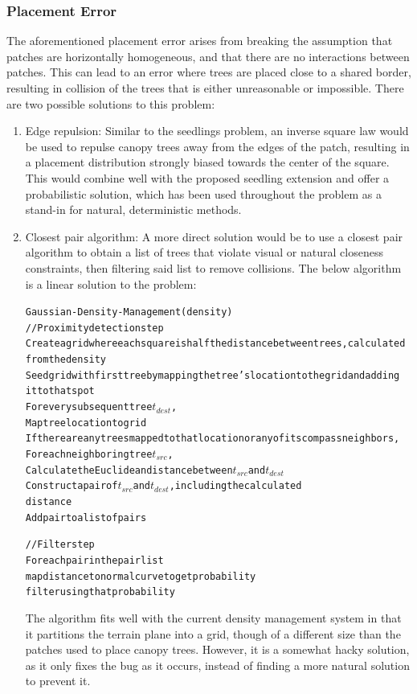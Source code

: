 \documentclass{article}
\newcommand{\tab}{\hspace*{2em}}
\begin{document}
            \subsubsection{Placement Error}
    \tab The aforementioned placement error arises from breaking the assumption that patches are
horizontally homogeneous, and that there are no interactions between patches. This can lead to an
error where trees are placed close to a shared border, resulting in collision of the trees that is
either unreasonable or impossible. There are two possible solutions to this problem:
\begin{enumerate}
    \item Edge repulsion: Similar to the seedlings problem, an inverse square law would be used to
repulse canopy trees away from the edges of the patch, resulting in a placement distribution
strongly biased towards the center of the square. This would combine well with the proposed
seedling extension and offer a probabilistic solution, which has been used throughout the problem
as a stand-in for natural, deterministic methods.

    \item Closest pair algorithm: A more direct solution would be to use a closest pair
algorithm\cite{kramii14} to obtain a list of trees that violate visual or natural closeness
constraints, then filtering said list to remove collisions. The below algorithm is a linear
solution to the problem:
\begin{alltt}
Gaussian-Density-Management(density)
    // Proximity detection step
    Create a grid where each square is half the distance between trees, calculated
        from the density
    Seed grid with first tree by mapping the tree's location to the grid and adding
        it to that spot
    For every subsequent tree \(t_{dest}\),
        Map tree location to grid
        If there are any trees mapped to that location or any of its compass neighbors,
            For each neighboring tree \(t_{src}\),
                Calculate the Euclidean distance between \(t_{src}\) and \(t_{dest}\)
                Construct a pair of \(t_{src}\) and \(t_{dest}\), including the calculated
                    distance
                Add pair to a list of pairs

    // Filter step
    For each pair in the pair list
        map distance to normal curve to get probability
        filter using that probability
    \end{alltt}
    \tab The algorithm fits well with the current density management system in that it partitions
the terrain plane into a grid, though of a different size than the patches used to place canopy
trees. However, it is a somewhat hacky solution, as it only fixes the bug as it occurs, instead of
finding a more natural solution to prevent it.


\end{enumerate}
\end{document}
